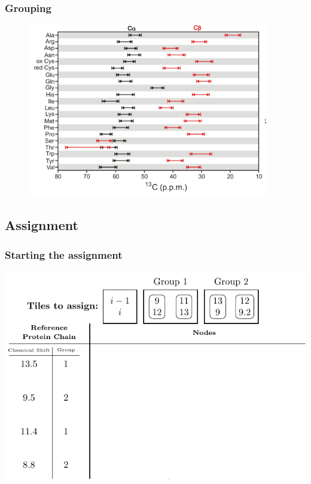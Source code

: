 \documentclass{beamer}
\begin{document}
\begin{frame}
	\frametitle{Grouping}
	\begin{figure}[H]
	\begin{center}
	\includegraphics[width=.65\textwidth]{carbon}
	\end{center}
	\end{figure}
\hfill \scriptsize\cite{carbon}
\end{frame}

\subsection{Assignment}

\begin{frame}
	\frametitle{Starting the assignment}
	\vspace{-.5cm}
	\center
	\includegraphics[width=.9\textwidth]{tilePlacement/step1}
\end{frame}
\end{document}
